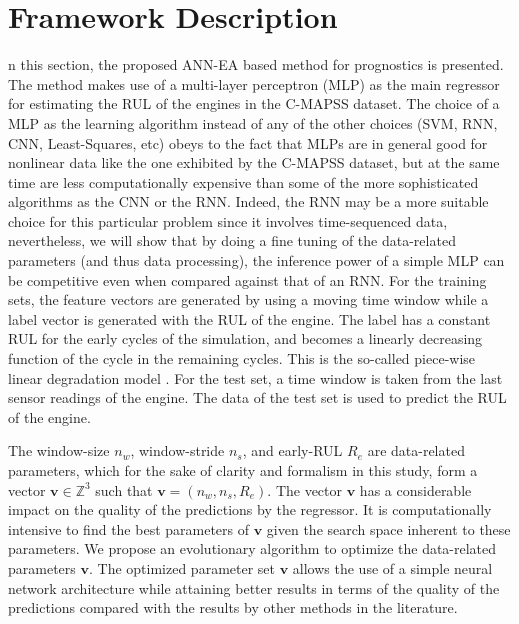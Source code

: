 \documentclass[preprint,12pt]{elsarticle}%
\begin{document}
\section{Framework Description}

\label{sec:method}

n this section, the proposed ANN-EA based method for prognostics is presented. The method makes use of a multi-layer perceptron (MLP) as the main regressor for estimating the RUL of the engines in the C-MAPSS dataset. The choice of a MLP as the learning algorithm instead of any of the other choices (SVM, RNN, CNN, Least-Squares, etc) obeys to the fact that MLPs are in general good for nonlinear data like the one exhibited by the C-MAPSS dataset, but at the same time are less computationally expensive than some of the more sophisticated algorithms as the CNN or the RNN. Indeed, the RNN may be a more suitable choice for this particular problem since it involves time-sequenced data, nevertheless, we will show that by doing a fine tuning of the data-related parameters (and thus data processing), the inference power of a simple MLP can be competitive even when compared against that of an RNN.   For the training sets, the feature vectors are generated by using a moving time window while a label vector is generated with the RUL of the engine. The label has a constant RUL for the early cycles of the simulation, and becomes a linearly decreasing function of the cycle in the remaining cycles. This is the so-called piece-wise linear degradation model \cite{Ramasso2014}. For the test set, a time window is taken from the last sensor readings of the engine. The data of the test set is used to predict the RUL of the engine.

The window-size $n_{w}$, window-stride $n_{s}$, and early-RUL $R_{e}$ are data-related parameters, which for the sake of clarity and formalism in this study, form a vector 
$\mathbf{v} \in \mathbb{Z}^{3}$ such that $\mathbf{v} = (n_{w}, n_{s}, R_{e})$. The vector $\mathbf{v}$ has a considerable impact on the quality of the predictions by the regressor. It is computationally intensive to find the best parameters of $\mathbf{v}$ given the search space inherent to these parameters. We propose an evolutionary algorithm to optimize the data-related parameters $\mathbf{v}$. The optimized parameter set $\mathbf{v}$ allows the use of a simple neural network architecture while attaining better results in terms of the quality of the predictions compared with the results by other methods in the literature.
\end{document}
